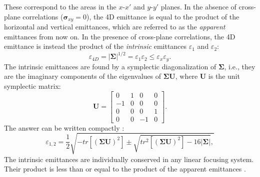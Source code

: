 %
These correspond to the areas in the $x$-$x'$ and $y$-$y'$ planes. In the absence of cross-plane correlations ($\bm{\sigma}_{xy} = 0$), the 4D emittance is equal to the product of the horizontal and vertical emittances, which are referred to as the \textit{apparent} emittances from now on. In the presence of cross-plane correlations, the 4D emittance is instead the product of the \textit{intrinsic} emittances $\varepsilon_1$ and $\varepsilon_2$:
%
\begin{equation} \label{eq:mode_emittances1}
    \varepsilon_{4D} = \left|{\bm{\Sigma}}\right|^{1/2} = \varepsilon_1\varepsilon_2 \le \varepsilon_x\varepsilon_y.
\end{equation}
%
The intrinsic emittances are found by a symplectic diagonalization of $\bm{\Sigma}$, i.e., they are the imaginary components of the eigenvalues of $\bm{\Sigma}\mathbf{U}$, where $\mathbf{U}$ is the unit symplectic matrix:
%
\begin{equation}
    \mathbf{U} = 
    \begin{bmatrix}
        0 & 1 & 0 & 0 \\
        -1 & 0 & 0 & 0 \\
        0 & 0 & 0 & 1 \\
        0 & 0 & -1 & 0
    \end{bmatrix}.
\end{equation}
%
The answer can be written compactly \cite{Xiao2013}:
%
\begin{equation}
    \varepsilon_{1, 2} = \frac{1}{2}\sqrt{
      -tr\left[(\bm{\Sigma} \mathbf{U})^2\right] \pm \sqrt{tr^2\left[(\bm{\Sigma} \mathbf{U})^2\right] - 16|{\bm{\Sigma}}|},
    }
\end{equation}
%
The intrinsic emittances are individually conserved in any linear focusing system. Their product is less than or equal to the product of the apparent emittances \cite{Buon1993}.

